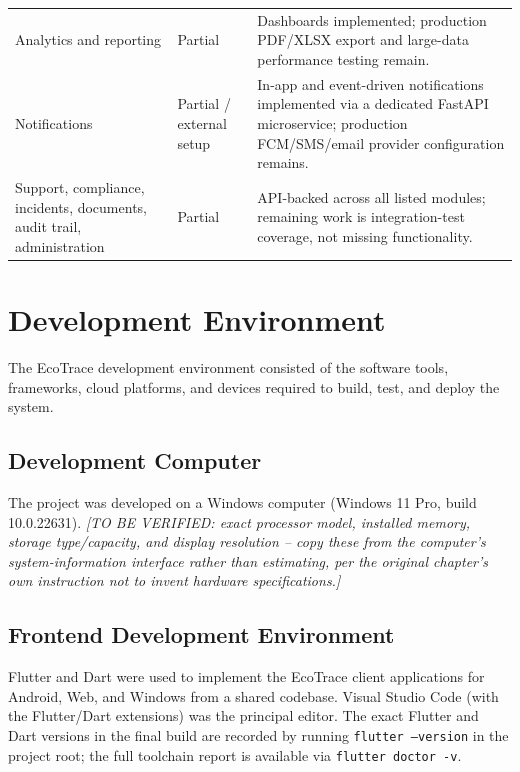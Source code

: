 \begin{longtable}{@{}p{3.6cm}p{2.4cm}p{7.2cm}@{}}
Analytics and reporting & Partial & Dashboards implemented; production PDF/XLSX export and large-data performance testing remain. \\
Notifications & Partial / external setup & In-app and event-driven notifications implemented via a dedicated FastAPI microservice; production FCM/SMS/email provider configuration remains. \\
Support, compliance, incidents, documents, audit trail, administration & Partial & API-backed across all listed modules; remaining work is integration-test coverage, not missing functionality. \\
\bottomrule
\end{longtable}

\section{Development Environment}

The EcoTrace development environment consisted of the software tools,
frameworks, cloud platforms, and devices required to build, test, and deploy
the system.

\subsection{Development Computer}
The project was developed on a Windows computer (Windows 11 Pro,
build 10.0.22631). \textit{[TO BE VERIFIED: exact processor model, installed
memory, storage type/capacity, and display resolution -- copy these from the
computer's system-information interface rather than estimating, per the
original chapter's own instruction not to invent hardware specifications.]}

\subsection{Frontend Development Environment}
Flutter and Dart were used to implement the EcoTrace client applications
for Android, Web, and Windows from a shared codebase. Visual Studio Code
(with the Flutter/Dart extensions) was the principal editor. The exact Flutter
and Dart versions in the final build are recorded by running
\texttt{flutter\ --version} in the project root; the full toolchain report is
available via \texttt{flutter\ doctor\ -v}.

